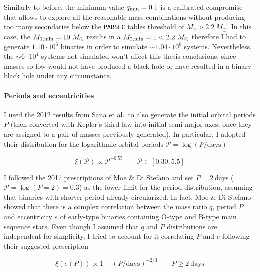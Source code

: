 \documentclass[a4paper,titlepage]{book}     	%
\newcommand{\sun}{\ensuremath{_\odot}}
\newcommand{\msun}{\ensuremath{M\sun}}
\begin{document}
Similarly to before, the minimum value $q_\textup{min}=0.1$ is a calibrated compromise that allows to explore all the reasonable mass combinations without producing too many secondaries below the \texttt{PARSEC} tables threshold of $M_2 > 2.2~\msun$. In this case, the $M_\textup{1,min} = 10~\msun$ results in a $M_\textup{2,min} = 1 < 2.2~\msun $ therefore I had to generate $1.10 \cdot 10^6$ binaries in order to simulate $\sim 1.04 \cdot 10^6$ systems. Nevertheless, the $\sim 6 \cdot 10^4$ systems not simulated won't affect this thesis conclusions, since masses so low would not have produced a black hole or have resulted in a binary black hole under any circumstance.

\paragraph{Periods and eccentricities} I used the 2012 results from Sana et al.\ to also generate the initial orbital periods $P$ (then converted with Kepler's third law into initial semi-major axes, once they are assigned to a pair of masses previously generated). In particular, I adopted their distribution for the logarithmic orbital periods $\mathcal{P} = \log(P/\text{days})$

\begin{equation}
	\xi(\mathcal{P}) \propto \mathcal{P}^{-0.55} \qquad \mathcal{P} \in [0.30,5.5]
\end{equation}

I followed the 2017 prescriptions of Moe \& Di Stefano \cite{MoeDiStefano2017} and set $P=2~$days ($\mathcal{P}=\log(P=2)=0.3$) as the lower limit for the period distribution, assuming that binaries with shorter period already circularized. In fact, Moe \& Di Stefano showed that there is a complex correlation between the mass ratio $q$, period $P$ and eccentricity $e$ of early-type binaries containing O-type and B-type main sequence stars. Even though I assumed that $q$ and $P$ distributions are independent for simplicity, I tried to account for it correlating $P$ and $e$ following their suggested prescription

\begin{equation}
	\xi (e (P)) \propto 1-(P/\text{days})^{-2/3} \qquad P \geq 2~\text{days}
\end{equation}
\end{document}
